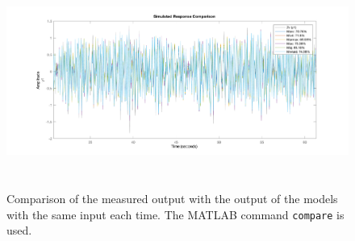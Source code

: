 \begin{figure}[h]
	\centering
	\includegraphics[height=7cm]{figures/comparison.png}
	\caption{Comparison of the measured output with the output of the models with the same input each time. The MATLAB command \texttt{compare} is used. }\label{fig:comparison }
\end{figure}

